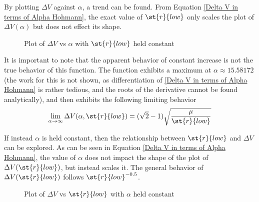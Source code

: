 \documentclass[../basicOrbitalDynamics.tex]{subfiles}
\begin{document}
By plotting $\Delta V$ against $\alpha$, a trend can be found. From Equation \eqref{Delta V in terms of Alpha Hohmann}, the exact value of $\st{r}{low}$ only scales the plot of $\Delta V(\alpha)$ but does not effect its shape.
\begin{figure}[H]
    \centering
    \def\rootMuOverR{5}
    \caption{Plot of $\Delta V$ vs $\alpha$ with $\st{r}{low}$ held constant}\label{fig:Hohmann Delta V r1 const}
\end{figure}

It is important to note that the apparent behavior of constant increase is not the true behavior of this function. The function exhibits a maximum at $\alpha\approx15.58172$ (the work for this is not shown, as differentiation of \eqref{Delta V in terms of Alpha Hohmann} is rather tedious, and the roots of the derivative cannot be found analytically), and then exhibits the following limiting behavior
$$\lim_{\alpha\rightarrow\infty}\Delta V(\alpha, \st{r}{low})=(\sqrt{2}-1)\sqrt{\frac{\mu}{\st{r}{low}}}$$

If instead $\alpha$ is held constant, then the relationship between $\st{r}{low}$ and $\Delta V$ can be explored. As can be seen in Equation \eqref{Delta V in terms of Alpha Hohmann}, the value of $\alpha$ does not impact the shape of the plot of $\Delta V(\st{r}{low})$, but instead scales it. The general behavior of $\Delta V(\st{r}{low})$ follows $\st{r}{low}^{-0.5}$.

\begin{figure}[H]
    \centering
    \def\multBy{1.25}
    \caption{Plot of $\Delta V$ vs $\st{r}{low}$ with $\alpha$ held constant}\label{fig:Hohmann Delta V alpha const}
\end{figure}
\end{document}
